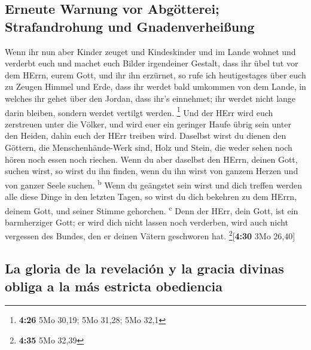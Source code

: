 \hypertarget{erneute-warnung-vor-abguxf6tterei-strafandrohung-und-gnadenverheiuxdfung}{%
\subsection{Erneute Warnung vor Abgötterei; Strafandrohung und
Gnadenverheißung}\label{erneute-warnung-vor-abguxf6tterei-strafandrohung-und-gnadenverheiuxdfung}}

 Wenn ihr nun aber Kinder zeuget und Kindeskinder und im
Lande wohnet und verderbt euch und machet euch Bilder irgendeiner
Gestalt, dass ihr übel tut vor dem HErrn, eurem Gott, und ihr ihn
erzürnet,  so rufe ich heutigestages über euch zu Zeugen
Himmel und Erde, dass ihr werdet bald umkommen von dem Lande, in welches
ihr gehet über den Jordan, dass ihr's einnehmet; ihr werdet nicht lange
darin bleiben, sondern werdet vertilgt werden. \footnote{\textbf{4:26}
  5Mo 30,19; 5Mo 31,28; 5Mo 32,1}  Und der HErr wird euch
zerstreuen unter die Völker, und wird euer ein geringer Haufe übrig sein
unter den Heiden, dahin euch der HErr treiben wird. 
Daselbst wirst du dienen den Göttern, die Menschenhände-Werk sind, Holz
und Stein, die weder sehen noch hören noch essen noch riechen.
 Wenn du aber daselbst den HErrn, deinen Gott, suchen
wirst, so wirst du ihn finden, wenn du ihn wirst von ganzem Herzen und
von ganzer Seele suchen. \textsuperscript{b}  Wenn du
geängstet sein wirst und dich treffen werden alle diese Dinge in den
letzten Tagen, so wirst du dich bekehren zu dem HErrn, deinem Gott, und
seiner Stimme gehorchen. \textsuperscript{c}  Denn der
HErr, dein Gott, ist ein barmherziger Gott; er wird dich nicht lassen
noch verderben, wird auch nicht vergessen des Bundes, den er deinen
Vätern geschworen hat. \footnote{\textbf{4:35} 5Mo 32,39}{[}\textbf{4:30}
3Mo 26,40{]}

\hypertarget{la-gloria-de-la-revelaciuxf3n-y-la-gracia-divinas-obliga-a-la-muxe1s-estricta-obediencia}{%
\subsection{La gloria de la revelación y la gracia divinas obliga a la
más estricta
obediencia}\label{la-gloria-de-la-revelaciuxf3n-y-la-gracia-divinas-obliga-a-la-muxe1s-estricta-obediencia}}

